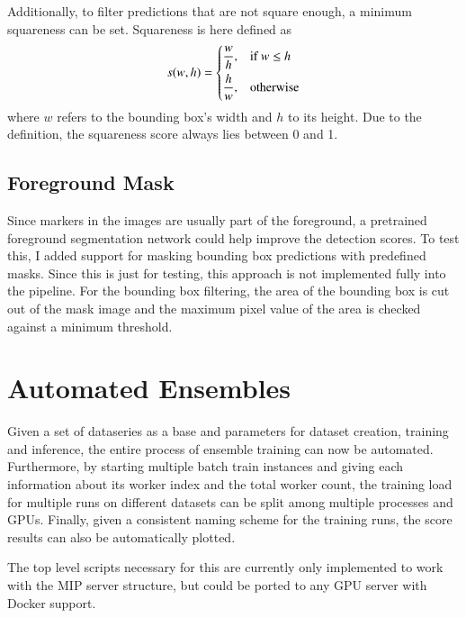 \documentclass[10pt]{book}
\begin{document}
Additionally, to filter predictions that are not square enough, %
a minimum squareness can be set. Squareness is here defined as $$ 
s(w,h)=
\begin{dcases}
    \frac{w}{h}, & \text{if } w\leq h\\
    \frac{h}{w}, & \text{otherwise}
\end{dcases} $$ where $w$ refers to the bounding box's width and $h$ to its height. Due to the definition, the squareness score always lies between 0 and 1.

\subsection{Foreground Mask}

Since markers in the images are usually part of the foreground, a pretrained foreground segmentation network could help improve the detection scores.
To test this, I added support for masking bounding box predictions with predefined masks. Since this is just for testing, this approach is not implemented fully into the pipeline. For the bounding box filtering, the area of the bounding box is cut out of the mask image and the maximum pixel value of the area is checked against a minimum threshold. %


\section{Automated Ensembles}

Given a set of dataseries as a base and parameters for dataset creation, training and inference, the entire process of ensemble training can now be automated. Furthermore, by starting multiple batch train instances and giving each information about its worker index and the total worker count, the training load for multiple runs on different datasets can be split among multiple processes and \acp{GPU}. Finally, given a consistent naming scheme for the training runs, the score results can also be automatically plotted.

The top level scripts necessary for this are currently only implemented to work with the \ac{MIP} server structure, but could be ported to any \ac{GPU} server with Docker support.
\end{document}
